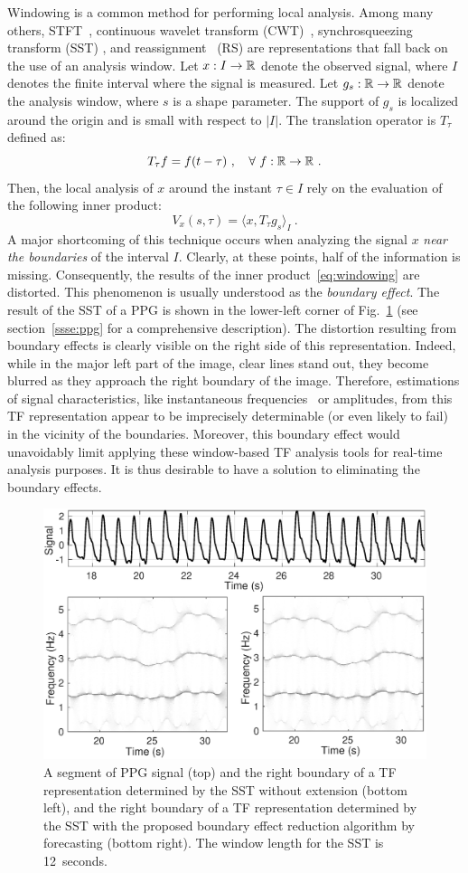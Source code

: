 \documentclass[journal]{IEEEtran}
\begin{document}
Windowing is a common method for performing local analysis. Among many others, STFT~\cite{Flandrin:1999}, continuous wavelet transform (CWT)~\cite{Da1992}, synchrosqueezing transform (SST) \cite{Daubechies11synchrosqueezed}, and reassignment~\cite{Auger13time} (RS) are representations that fall back on the use of an analysis window. Let $x:I\to{\mathbb R}$ denote the observed signal, where $I$ denotes the finite interval where the signal is measured. Let $g_s:{\mathbb R}\to{\mathbb R}$ denote the analysis window, where $s$ is a shape parameter. The support of $g_s$ is localized around the origin and is small with respect to $|I|$. The translation operator is $T_\tau$ defined as:
\[
T_\tau f = f(t-\tau)\ ,\quad \forall\ f:{\mathbb R}\to{\mathbb R}\ .
\]
Then, the local analysis of $x$ around the instant $\tau\in I$ rely on the evaluation of the following inner product:
\begin{equation}
V_x(s,\tau) = \langle x, T_\tau g_s \rangle_I \ .
\label{eq:windowing}
\end{equation}
A major shortcoming of this technique occurs when analyzing the signal $x$ {\em near the boundaries} of the interval $I$. Clearly, at these points, half of the information is missing. Consequently, the results of the inner product~\eqref{eq:windowing} are distorted. This phenomenon is usually understood as the \emph{boundary effect}. The result of the SST of a PPG is shown in the lower-left corner of Fig.~\ref{fig:ex.intro} (see section~\ref{ssse:ppg} for a comprehensive description). The distortion resulting from boundary effects is clearly visible on the right side of this representation. Indeed, while in the major left part of the image, clear lines stand out, they become blurred as they approach the right boundary of the image. Therefore, estimations of signal characteristics, like instantaneous frequencies~\cite{Delprat92asymptotic} or amplitudes, from this TF representation appear to be imprecisely determinable (or even likely to fail) in the vicinity of the boundaries. Moreover, this boundary effect would unavoidably limit applying these window-based TF analysis tools for real-time analysis purposes. It is thus desirable to have a solution to eliminating the boundary effects.

\begin{figure}
\centering
\includegraphics[width=.48\textwidth]{PPGsig.eps}
\caption{A segment of PPG signal (top) and the right boundary of a TF representation determined by the SST without extension (bottom left), and the right boundary of a TF representation determined by the SST with the proposed boundary effect reduction algorithm by forecasting (bottom right). The window length for the SST is 12~seconds.}
\label{fig:ex.intro}
\end{figure}
\end{document}
